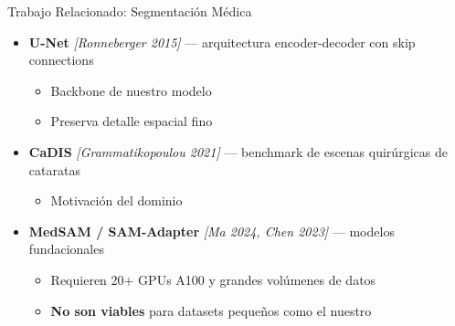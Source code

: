 \documentclass[aspectratio=169]{beamer}
\begin{document}

\begin{frame}{Trabajo Relacionado: Segmentación Médica}
\begin{itemize}
    \item \textbf{U-Net} \textit{[Ronneberger 2015]} — arquitectura encoder-decoder con skip connections
    \begin{itemize}
        \item Backbone de nuestro modelo
        \item Preserva detalle espacial fino
    \end{itemize}
    \vspace{0.4em}
    \item \textbf{CaDIS} \textit{[Grammatikopoulou 2021]} — benchmark de escenas quirúrgicas de cataratas
    \begin{itemize}
        \item Motivación del dominio
    \end{itemize}
    \vspace{0.4em}
    \item \textbf{MedSAM / SAM-Adapter} \textit{[Ma 2024, Chen 2023]} — modelos fundacionales
    \begin{itemize}
        \item Requieren 20+ GPUs A100 y grandes volúmenes de datos
        \item \textbf{No son viables} para datasets pequeños como el nuestro
    \end{itemize}
\end{itemize}
\end{frame}
\end{document}
